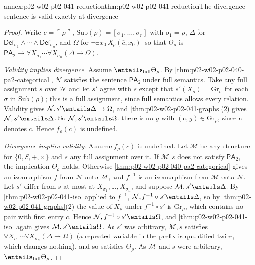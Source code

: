 \begin{annexitem}{annex:p02-w02-p02-041-reduction}{thm:p02-w02-p02-041-reduction}{The divergence sentence is valid exactly at divergence}
\begin{proof}
Write \(c=\ulcorner\rho\urcorner\),
\(\mathrm{Sub}(\rho)=[\sigma_1,\ldots,\sigma_n]\) with \(\sigma_1=\rho\),
\(\Delta\) for \(\mathsf{Def}_{\sigma_1}\land\cdots\land\mathsf{Def}_{\sigma_n}\),
and \(\Omega\) for \(\neg\exists x_0\,X_\rho(\overline c,x_0)\), so that
\(\Theta_\rho\) is \(\mathsf{PA}_2\to\forall X_{\sigma_1}\cdots\forall X_{\sigma_n}(\Delta\to\Omega)\).

\emph{Validity implies divergence.}  Assume \(\entails_{\mathrm{full}}\Theta_\rho\).
By \cref{thm:p02-w02-p02-040-pa2-categorical}, \(\mathcal N\) satisfies the
sentence \(\mathsf{PA}_2\) under full semantics.  Take any full assignment
\(s\) over \(\mathcal N\) and let \(s'\) agree with \(s\) except that
\(s'(X_\sigma)=\mathrm{Gr}_\sigma\) for each \(\sigma\) in
\(\mathrm{Sub}(\rho)\); this is a full assignment, since full semantics allows
every relation.  Validity gives \(\mathcal N,s'\entails\Delta\to\Omega\), and
\cref{thm:p02-w02-p02-041-graphs}(2) gives \(\mathcal N,s'\entails\Delta\).
So \(\mathcal N,s'\entails\Omega\): there is no \(y\) with
\((c,y)\in\mathrm{Gr}_\rho\), since \(\overline c\) denotes \(c\).  Hence
\(f_\rho(c)\) is undefined.

\emph{Divergence implies validity.}  Assume \(f_\rho(c)\) is undefined.  Let
\(\mathcal M\) be any structure for \(\{0,S,+,\times\}\) and \(s\) any full
assignment over it.  If \(\mathcal M,s\) does not satisfy \(\mathsf{PA}_2\),
the implication \(\Theta_\rho\) holds.  Otherwise
\cref{thm:p02-w02-p02-040-pa2-categorical} gives an isomorphism \(f\) from
\(\mathcal N\) onto \(\mathcal M\), and \(f^{-1}\) is an isomorphism from
\(\mathcal M\) onto \(\mathcal N\).  Let \(s'\) differ from \(s\) at most at
\(X_{\sigma_1},\ldots,X_{\sigma_n}\), and suppose
\(\mathcal M,s'\entails\Delta\).  By \cref{thm:p02-w02-p02-041-iso} applied
to \(f^{-1}\), \(\mathcal N,f^{-1}\circ s'\entails\Delta\), so by
\cref{thm:p02-w02-p02-041-graphs}(2) the value of \(X_\rho\) under
\(f^{-1}\circ s'\) is \(\mathrm{Gr}_\rho\), which contains no pair with first
entry \(c\).  Hence \(\mathcal N,f^{-1}\circ s'\entails\Omega\), and
\cref{thm:p02-w02-p02-041-iso} again gives \(\mathcal M,s'\entails\Omega\).  As
\(s'\) was arbitrary, \(\mathcal M,s\) satisfies
\(\forall X_{\sigma_1}\cdots\forall X_{\sigma_n}(\Delta\to\Omega)\) (a repeated
variable in the prefix is quantified twice, which changes nothing), and so
satisfies \(\Theta_\rho\).  As \(\mathcal M\) and \(s\) were arbitrary,
\(\entails_{\mathrm{full}}\Theta_\rho\).
\end{proof}
\end{annexitem}

